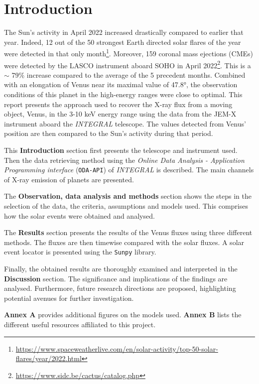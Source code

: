\section{Introduction}
The Sun's activity in April 2022 increased drastically compared to earlier that year. Indeed, 12 out of the 50 strongest Earth directed solar flares of the year were detected in that only month\footnote{\url{https://www.spaceweatherlive.com/en/solar-activity/top-50-solar-flares/year/2022.html}}. Moreover, 159 coronal mass ejections (CMEs) were detected by the LASCO instrument aboard SOHO in April 2022\footnote{\url{https://www.sidc.be/cactus/catalog.php}}. This is a $\sim$ 79\% increase compared to the average of the 5 precedent months. Combined with an elongation of Venus near its maximal value of 47.8°, the observation conditions of this planet in the high-energy ranges were close to optimal. This report presents the approach used to recover the X-ray flux from a moving object, Venus, in the 3-10 keV energy range using the data from the JEM-X instrument aboard the \textit{INTEGRAL} telescope. The values detected from Venus' position are then compared to the Sun's activity during that period.

This \textbf{Introduction }section first presents the telescope and instrument used. Then the data retrieving method using the \textit{Online Data Analysis - Application Programming interface} (\texttt{ODA-API}) of \textit{INTEGRAL} is described. The main channels of X-ray emission of planets are presented.

The \textbf{Observation, data analysis and methods} section shows the steps in the selection of the data, the criteria, assumptions and models used. This comprises how the solar events were obtained and analysed.

The \textbf{Results} section presents the results of the Venus fluxes using three different methods. The fluxes are then timewise compared with the solar fluxes. A solar event locator is presented using the \texttt{Sunpy} library.

Finally, the obtained results are thoroughly examined and interpreted in the \textbf{Discussion} section. The significance and implications of the findings are analysed. Furthermore, future research directions are proposed, highlighting potential avenues for further investigation. 

\textbf{Annex A} provides additional figures on the models used. \textbf{Annex B} lists the different useful resources affiliated to this project.

